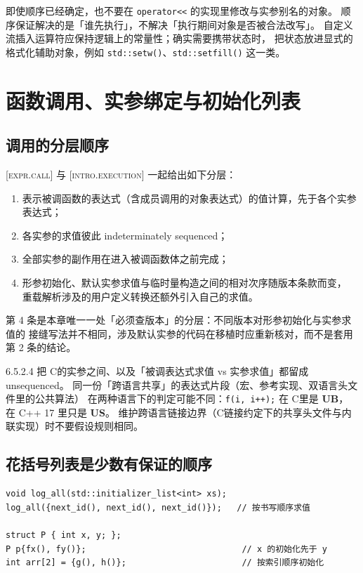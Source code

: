 \documentclass[12pt,a4paper,fontset=fandol]{ctexbook}
\newcommand{\Fn}[1]{\texttt{#1()}}
\newcommand{\Tp}[1]{\texttt{#1}}
\newcommand{\Lang}[1]{\textsf{#1}}
\newcommand{\CL}{\Lang{C}}
\newcommand{\CPP}{\Lang{C++}}
\newcommand{\UB}{\textbf{\textsf{UB}}}
\newcommand{\USB}{\textbf{\textsf{US}}}
\newcommand{\Std}[1]{\textsc{[#1]}}
\newcommand{\Clause}[1]{\textsc{\small #1}}
\begin{document}
即使顺序已经确定，也不要在 \Tp{operator<<} 的实现里修改与实参别名的对象。
顺序保证解决的是「谁先执行」，不解决「执行期间对象是否被合法改写」。
自定义流插入运算符应保持逻辑上的常量性；确实需要携带状态时，
把状态放进显式的格式化辅助对象，例如 \Fn{std::setw}、\Fn{std::setfill} 这一类。

\section{函数调用、实参绑定与初始化列表}\label{sec:ub08-call}

\subsection{调用的分层顺序}\label{sec:ub08-call-order}

\Std{expr.call} 与 \Std{intro.execution} 一起给出如下分层：

\begin{enumerate}
\item 表示被调函数的表达式（含成员调用的对象表达式）的值计算，先于各个实参表达式；
\item 各实参的求值彼此 indeterminately sequenced；
\item 全部实参的副作用在进入被调函数体之前完成；
\item 形参初始化、默认实参求值与临时量构造之间的相对次序随版本条款而变，
      重载解析涉及的用户定义转换还额外引入自己的求值。
\end{enumerate}

第 4 条是本章唯一一处「必须查版本」的分层：不同版本对形参初始化与实参求值的
接缝写法并不相同，涉及默认实参的代码在移植时应重新核对，而不是套用第 2 条的结论。

\begin{warning}[title={\CL 与 \CPP 在这一点上结论不同}]
\Clause{6.5.2.4} 把 \CL 的实参之间、以及「被调表达式求值 vs 实参求值」都留成 unsequenced。
同一份「跨语言共享」的表达式片段（宏、参考实现、双语言头文件里的公共算法）
在两种语言下的判定可能不同：\Tp{f(i, i++);} 在 \CL 里是 \UB{}，
在 \CPP{} 17 里只是 \USB{}。
维护跨语言链接边界（\CL 链接约定下的共享头文件与内联实现）时不要假设规则相同。
\end{warning}

\subsection{花括号列表是少数有保证的顺序}\label{sec:ub08-initlist}

\begin{lstlisting}[style=cppstyle,caption={列表初始化自左向右}]
void log_all(std::initializer_list<int> xs);
log_all({next_id(), next_id(), next_id()});   // 按书写顺序求值

struct P { int x, y; };
P p{fx(), fy()};                               // x 的初始化先于 y
int arr[2] = {g(), h()};                       // 按索引顺序初始化
\end{lstlisting}
\end{document}
